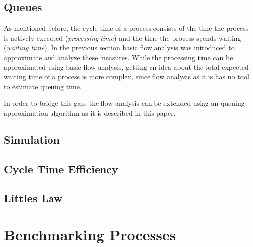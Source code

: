 %	



\subsection{Queues}
As mentioned before, the \gls{cycle-time} of a process consists of the time the process is actively executed (\textit{processing time}) and the time the process spends waiting (\textit{waiting time}). In the previous section basic flow analysis was introduced to approximate and analyze these measures.  
While the processing time can be approximated using basic flow analysis, getting an idea about the total expected waiting time of a process is more complex, since flow analysis as it is has no tool to estimate queuing time. 

In order to bridge this gap, the flow analysis can be extended using an queuing approximation algorithm as it is described in this paper\cite{ha2006approximate}.


\subsection{Simulation}


\subsection{Cycle Time Efficiency}
\subsection{Littles Law}
\section{Benchmarking Processes}


